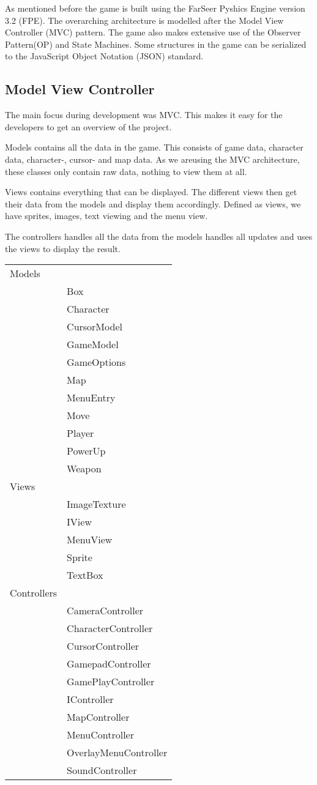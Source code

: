 As mentioned before the game is built using the FarSeer Pyshics Engine version 3.2 (FPE). The overarching architecture is modelled after the Model View Controller (MVC) pattern. The game also makes extensive use of the Observer Pattern(OP) and State Machines. Some structures in the game can be serialized to the JavaScript Object Notation (JSON) standard. 


\subsection{Model View Controller}
The main focus during development was MVC. This makes it easy for the developers to get an overview of the project.

Models contains all the data in the game. This consists of game data, character data, character-, cursor- and map data. As we areusing the MVC architecture, these classes only contain raw data, nothing to view them at all.

Views contains everything that can be displayed. The different views then get their data from the models and display them accordingly. Defined as views, we have sprites, images, text viewing and the menu view.

The controllers handles all the data from the models handles all updates and uses the views to display the result.\\


\begin{tabular}{ll}
Models & \\
&Box\\
&Character\\
&CursorModel\\
&GameModel\\
&GameOptions\\
&Map\\
&MenuEntry\\
&Move\\
&Player\\
&PowerUp\\
&Weapon\\

Views & \\
&ImageTexture\\
&IView\\
&MenuView\\
&Sprite\\
&TextBox\\

Controllers & \\
&CameraController\\
&CharacterController\\
&CursorController\\
&GamepadController\\
&GamePlayController\\
&IController\\
&MapController\\
&MenuController\\
&OverlayMenuController\\
&SoundController\\
\end{tabular}




